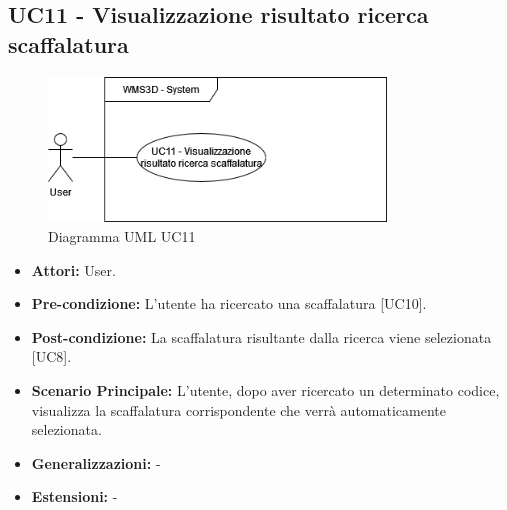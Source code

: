 \subsection{UC11 - Visualizzazione risultato ricerca scaffalatura}
\begin{figure}[H]
  \centering
  \includegraphics[width=0.8\textwidth]{UC_diagrams_11-20/UC11.drawio.png}
   \caption{Diagramma UML UC11}
\end{figure}
\begin{itemize}
    \item \textbf{Attori:} User.
    \item \textbf{Pre-condizione:} L'utente ha ricercato una scaffalatura [UC10].
    \item \textbf{Post-condizione:} La scaffalatura risultante dalla ricerca viene selezionata [UC8].
    \item \textbf{Scenario Principale:} L'utente, dopo aver ricercato un determinato codice, visualizza la scaffalatura corrispondente che verrà automaticamente selezionata.
    \item \textbf{Generalizzazioni:} -
    \item \textbf{Estensioni:} -
\end{itemize}